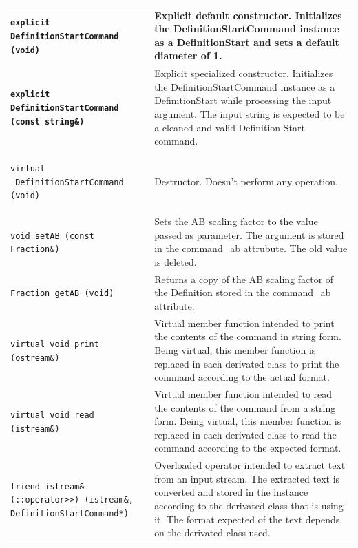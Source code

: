 \documentclass[11pt,twoside,openany,x11names,svgnames]{memoir}
\begin{document}
\begin{table}[h]\footnotesize
\centering
\begin{tabular}{| >{\bfseries}p{10cm} | p{5.5cm} |}
	\hline
	
	\texttt{explicit DefinitionStartCommand (void)} & Explicit default constructor. Initializes the DefinitionStartCommand instance as a DefinitionStart and sets a default diameter of 1. \\
	
	\hline
	
	\texttt{explicit DefinitionStartCommand (const string\&)} & Explicit specialized constructor. Initializes the DefinitionStartCommand instance as a DefinitionStart while processing the input argument. The input string is expected to be a cleaned and valid Definition Start command. \\
	
	\hline
	
	\texttt{virtual ~DefinitionStartCommand (void)} & Destructor. Doesn't perform any operation. \\
	
	\hline
	
	\texttt{void setAB (const Fraction\&)} & Sets the AB scaling factor to the value passed as parameter. The argument is stored in the command\_ab attrubute. The old value is deleted. \\
	
	\hline	
	
	\texttt{Fraction getAB (void)} & Returns a copy of the AB scaling factor of the Definition stored in the command\_ab attribute. \\
		
	\hline
	
	\texttt{virtual void print (ostream\&)} & Virtual member function intended to print the contents of the command in string form. Being virtual, this member function is replaced in each derivated class to print the command according to the actual format. \\
	
	\hline
	
	\texttt{virtual void read (istream\&)} & Virtual member function intended to read the contents of the command from a string form. Being virtual, this member function is replaced in each derivated class to read the command according to the expected format. \\
	
	\hline	
		
	\texttt{friend istream\& (::operator>>) (istream\&, DefinitionStartCommand*)} & Overloaded operator intended to extract text from an input stream. The extracted text is converted and stored in the instance according to the derivated class that is using it. The format expected of the text depends on the derivated class used. \\
	

\end{tabular}
\end{table}
\end{document}
